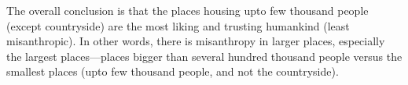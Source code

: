 \documentclass[11pt, letterpaper]{article}
\begin{document}
\begin{spacing}{1.4}
 The overall conclusion is that the places housing upto few thousand people
 (except countryside) are the most liking and trusting humankind (least
 misanthropic). In other words, there is misanthropy in larger places,
 especially the largest places---places bigger than
 several hundred thousand people versus the smallest places (upto few thousand people, and not the countryside).







 



\end{spacing}
\end{document}
